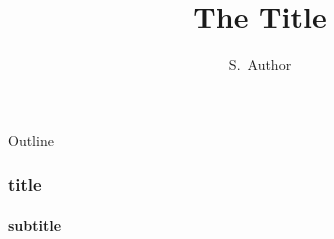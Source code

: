 \documentclass{beamer}
\title{The Title}
\author{S.~Author}
\institute{The Institute}
\begin{document}
{
\begin{frame}[plain]
  \titlepage
\end{frame}
}

\begin{frame}{Outline}
  \tableofcontents
\end{frame}

\begin{frame}
\frametitle{title}
\framesubtitle{subtitle}
\end{frame}
\end{document}
